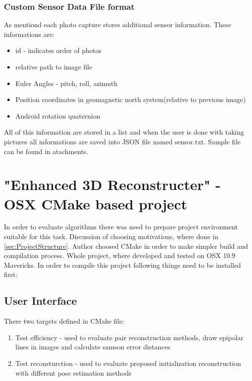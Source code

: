 \subsubsection{Custom Sensor Data File format}
As mentiond each photo capture stores additional sensor information. These informations are: 
\begin{itemize}
\item id - indicates order of photos
\item relative path to image file
\item Euler Angles - pitch, roll, azimuth %
\item Position coordinates in geomagnetic north system(relative to previous image)
\item Android rotation quaternion %
\end{itemize} 
All of this information are stored in a list and when the user is done with taking pictures all informations are saved into JSON file named sensor.txt. Sample file can be found in atachments.\pagebreak
\section{"Enhanced 3D Reconstructer" - OSX CMake based project}
In order to evaluate algorithms there was need to prepare project environment suitable for this task. Discussion of choosing motivations, where done in \ref{sec:ProjectStructure}. Author choosed CMake in order to make simpler build and compilation process. Whole project, where developed and tested on OSX 10.9 Mavericks. In order to compile this project following things need to be installed first:
\subsection{User Interface}
There two targets defined in CMake file:
\begin{enumerate}
\item Test efficiency - used to evaluate pair reconstruction methods, draw epipolar lines in images and calculate samson error distances
\item Test reconsturction - used to evaluate proposed initialization reconstruction with different pose estimation methods
\end{enumerate}
